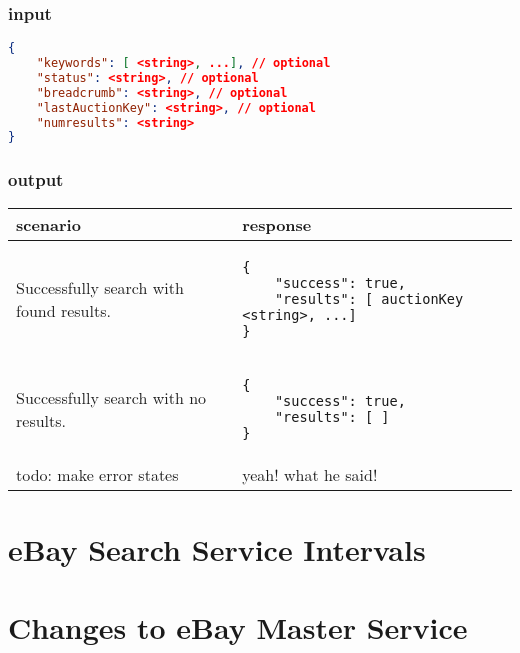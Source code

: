 \documentclass[12pt,a4paper]{article}
\begin{document}
\subsubsection{input}
\begin{lstlisting}[language=json,firstnumber=1]
{
    "keywords": [ <string>, ...], // optional
    "status": <string>, // optional
    "breadcrumb": <string>, // optional
    "lastAuctionKey": <string>, // optional
    "numresults": <string>
}
\end{lstlisting}

\subsubsection{output}
\begin{center}
    \begin{tabular}{| p{5cm} | l |}
        \hline
        \textbf{scenario} & \textbf{response} \\
        \hline
        Successfully search with found results. &
        \begin{lstlisting}[boxpos=t,language=tablejson,firstnumber=1]
{
    "success": true,
    "results": [ auctionKey <string>, ...]
}
        \end{lstlisting} \\ 
        \hline
 \hline
        Successfully search with no results. &
        \begin{lstlisting}[boxpos=t,language=tablejson,firstnumber=1]
{
    "success": true,
    "results": [ ]
}
        \end{lstlisting} \\ 
        \hline
            todo: make error states & yeah! what he said! \\
        \hline
    \end{tabular}
\end{center}





\section{eBay Search Service Intervals}


\section{Changes to eBay Master Service}
\end{document}
